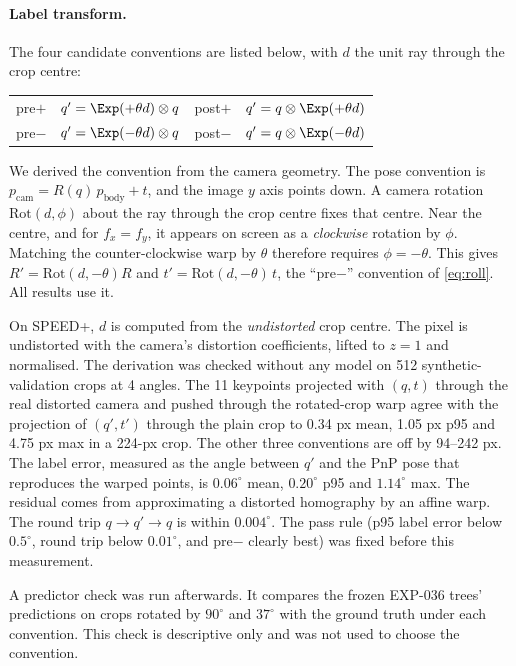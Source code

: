 \paragraph{Label transform.}
The four candidate conventions are listed below, with $d$ the unit ray through the crop centre:
\begin{center}\footnotesize
\begin{tabular}{@{}ll@{\qquad}ll@{}}
  \toprule
  pre$+$ & $q'=\Exp(+\theta d)\otimes q$ & post$+$ & $q'=q\otimes\Exp(+\theta d)$\\
  pre$-$ & $q'=\Exp(-\theta d)\otimes q$ & post$-$ & $q'=q\otimes\Exp(-\theta d)$\\
  \bottomrule
\end{tabular}
\end{center}
We derived the convention from the camera geometry. The pose convention is $p_{\text{cam}}=R(q)\,p_{\text{body}}+t$, and the image $y$ axis points down. A camera rotation $\mathrm{Rot}(d,\phi)$ about the ray through the crop centre fixes that centre. Near the centre, and for $f_x=f_y$, it appears on screen as a \emph{clockwise} rotation by $\phi$. Matching the counter-clockwise warp by $\theta$ therefore requires $\phi=-\theta$. This gives $R'=\mathrm{Rot}(d,-\theta)R$ and $t'=\mathrm{Rot}(d,-\theta)\,t$, \ie the ``pre$-$'' convention of \cref{eq:roll}. All results use it.

On SPEED+, $d$ is computed from the \emph{undistorted} crop centre. The pixel is undistorted with the camera's distortion coefficients, lifted to $z=1$ and normalised. The derivation was checked without any model on 512 synthetic-validation crops at 4 angles. The 11 keypoints projected with $(q,t)$ through the real distorted camera and pushed through the rotated-crop warp agree with the projection of $(q',t')$ through the plain crop to 0.34 px mean, 1.05 px p95 and 4.75 px max in a 224-px crop. The other three conventions are off by 94--242 px. The label error, measured as the angle between $q'$ and the PnP pose that reproduces the warped points, is $0.06^\circ$ mean, $0.20^\circ$ p95 and $1.14^\circ$ max. The residual comes from approximating a distorted homography by an affine warp. The round trip $q\to q'\to q$ is within $0.004^\circ$. The pass rule (p95 label error below $0.5^\circ$, round trip below $0.01^\circ$, and pre$-$ clearly best) was fixed before this measurement.

A predictor check was run afterwards. It compares the frozen EXP-036 trees' predictions on crops rotated by $90^\circ$ and $37^\circ$ with the ground truth under each convention. This check is descriptive only and was not used to choose the convention.

